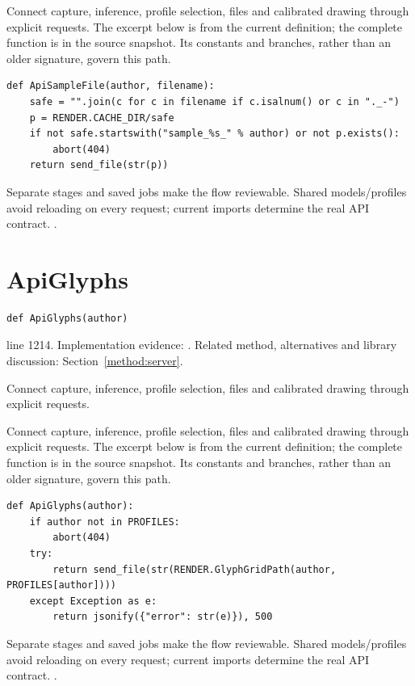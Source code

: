 Connect capture, inference, profile selection, files and calibrated drawing through explicit requests. The excerpt below is from the current definition; the complete function is in the source snapshot. Its constants and branches, rather than an older signature, govern this path.


\begin{lstlisting}[style=plain]
def ApiSampleFile(author, filename):
    safe = "".join(c for c in filename if c.isalnum() or c in "._-")
    p = RENDER.CACHE_DIR/safe
    if not safe.startswith("sample_%s_" % author) or not p.exists():
        abort(404)
    return send_file(str(p))
\end{lstlisting}
Separate stages and saved jobs make the flow reviewable. Shared models/profiles avoid reloading on every request; current imports determine the real API contract. \cite{flaskdocs,pillowops,code2026}.


\section{ApiGlyphs}\label{fn:web-server:ApiGlyphs}
\begin{lstlisting}[style=sig]
def ApiGlyphs(author)
\end{lstlisting}
 line 1214. Implementation evidence: \cite{code2026}. Related method, alternatives and library discussion: Section~\ref{method:server}.


Connect capture, inference, profile selection, files and calibrated drawing through explicit requests.


Connect capture, inference, profile selection, files and calibrated drawing through explicit requests. The excerpt below is from the current definition; the complete function is in the source snapshot. Its constants and branches, rather than an older signature, govern this path.


\begin{lstlisting}[style=plain]
def ApiGlyphs(author):
    if author not in PROFILES:
        abort(404)
    try:
        return send_file(str(RENDER.GlyphGridPath(author, PROFILES[author])))
    except Exception as e:
        return jsonify({"error": str(e)}), 500
\end{lstlisting}
Separate stages and saved jobs make the flow reviewable. Shared models/profiles avoid reloading on every request; current imports determine the real API contract. \cite{flaskdocs,pillowops,code2026}.


